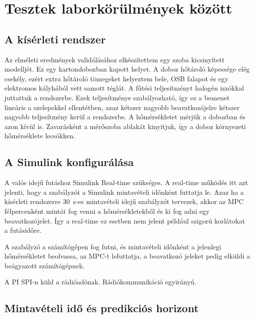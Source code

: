 \chapter{Tesztek laborkörülmények között}

\section{A kísérleti rendszer}
Az elméleti eredmények validálásához elkészítettem egy szoba kicsinyített modelljét. Ez egy kartondobozban kapott helyet. A doboz hőtároló képessége elég csekély, ezért extra hőtároló tömegeket helyeztem bele, OSB falapot és egy elektromos kályhából vett samott téglát.
A fűtési teljesítményt halogén izzókkal juttattuk a rendszerbe. Ezek teljesítménye szabályozható, így ez a bemenet lineáris a szelepekkel ellentétben, azaz kétszer nagyobb beavatkozójelre kétszer nagyobb teljesítmény kerül a rendszerbe.
A hőmérsékletet mérjük a dobozban és azon kívül is. Zavarásként a mérőszoba ablakát kinyitjuk, így a doboz környezeti hőmérséklete lecsökken.

\section{A Simulink konfigurálása}
A valós idejű futáshoz Simulink  Real-time szükséges. A real-time működés itt azt jelenti, hogy a szabályzót a Simulink mintavételi időnként futtatja le. Azaz ha a kísérleti rendszerre \SI{30}{\second}-es mintavételi idejű szabályzót tervezek, akkor az MPC félpercenként mintát fog venni a hőmérsékletekből és ki fog adni egy beavatkozójelet. Így a real-time ez esetben nem jelent például szigorú korlátokat a futásidőre.



A szabályzó a számítógépen fog futni, és mintavételi időnként a jelenlegi hőmérsékletet beolvassa, az MPC-t lefuttatja, a beavatkozó jeleket pedig elküldi a beágyazott számítógépnek.





A PI SPI-n küld a rádióadónak.
Rádiókommunikáció egyirányú.

\section{Mintavételi idő és predikciós horizont}

